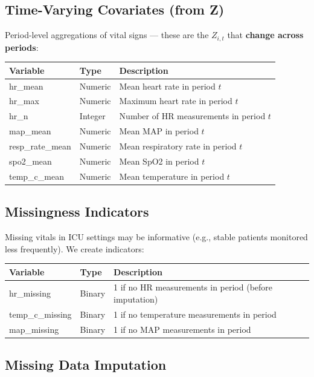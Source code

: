 \documentclass[11pt]{article}
\begin{document}
\subsection{Time-Varying Covariates (from Z)}

Period-level aggregations of vital signs --- these are the $Z_{i,t}$ that \textbf{change across periods}:

\begin{longtable}{L{4cm}L{2cm}L{8cm}}
\toprule
\textbf{Variable} & \textbf{Type} & \textbf{Description} \\
\midrule
\endhead
hr\_mean & Numeric & Mean heart rate in period $t$ \\
hr\_max & Numeric & Maximum heart rate in period $t$ \\
hr\_n & Integer & Number of HR measurements in period $t$ \\
map\_mean & Numeric & Mean MAP in period $t$ \\
resp\_rate\_mean & Numeric & Mean respiratory rate in period $t$ \\
spo2\_mean & Numeric & Mean SpO2 in period $t$ \\
temp\_c\_mean & Numeric & Mean temperature in period $t$ \\
\bottomrule
\end{longtable}

\subsection{Missingness Indicators}

Missing vitals in ICU settings may be informative (e.g., stable patients monitored less frequently). We create indicators:

\begin{longtable}{L{4cm}L{2cm}L{8cm}}
\toprule
\textbf{Variable} & \textbf{Type} & \textbf{Description} \\
\midrule
\endhead
hr\_missing & Binary & 1 if no HR measurements in period (before imputation) \\
temp\_c\_missing & Binary & 1 if no temperature measurements in period \\
map\_missing & Binary & 1 if no MAP measurements in period \\
\bottomrule
\end{longtable}

\subsection{Missing Data Imputation}
\end{document}

